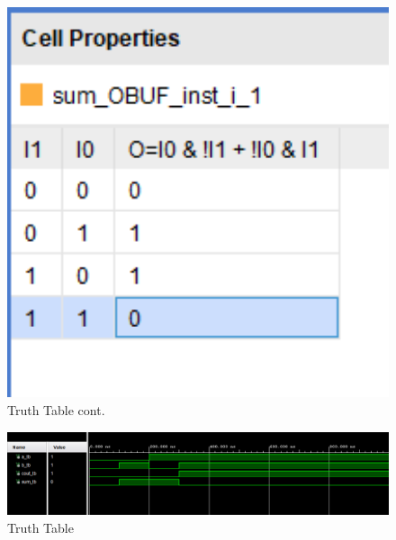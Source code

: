 \documentclass{article}
\begin{document}
\begin{figure}[h]
\begin{center}
\includegraphics[width=1\textwidth]{halfaddTruthTable1.png} %
\caption{Truth Table cont.}
\end{center}
\end{figure}


\begin{figure}[h]
\begin{center}
\includegraphics[width=1\textwidth]{halfaddWaveForm.png} %
\caption{Truth Table}
\end{center}
\end{figure}
\end{document}
